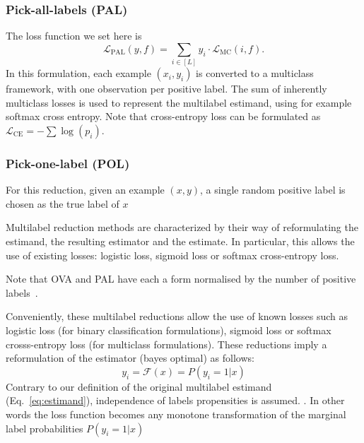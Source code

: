 \subsubsection*{Pick-all-labels (PAL)}
The loss function we set here is
%
\begin{equation}
\mathcal{L}_{\mathrm{PAL}}(y, f) = \sum_{i \in[L]} y_{i} \cdot \mathcal{L}_{\mathrm{MC}}(i, f).
\end{equation}
%
In this formulation, each example $(x_i, y_i)$ is converted to a multiclass framework, with one observation per positive label. The sum of inherently multiclass losses is used to represent the multilabel estimand, using for example softmax cross entropy. Note that cross-entropy loss can be formulated as \(\mathcal{L}_{\text {CE}}=-\sum \log \left(p_{i}\right)\).

\subsubsection*{Pick-one-label (POL)}

For this reduction, given an example $(x,y)$, a single random positive label is chosen as the true label of $x$

\vspace{\baselineskip}

Multilabel reduction methods are characterized by their way of reformulating the estimand, the resulting estimator and the estimate. In particular, this allows the use of existing losses: logistic loss, sigmoid loss or softmax cross-entropy loss.

Note that OVA and PAL have each a form normalised by the number of positive labels~\cite{multilabelReduction}.

Conveniently, these multilabel reductions allow the use of known losses such as logistic loss (for binary classification formulations), sigmoid loss or softmax crosss-entropy loss (for multiclass formulations). These reductions imply a reformulation of the estimator (bayes optimal) as follows:
%
\begin{equation}
  y_i = \mathcal{F}(x) = P(y_i = 1 | x)
\end{equation}
%
Contrary to our definition of the original multilabel estimand (Eq.~\ref{eq:estimand}), independence of labels propensities is assumed. . In other words the loss function becomes any monotone transformation of the marginal label probabilities $ P(y_i = 1 | x)$ ~\cite{OVA2, multilabelMetrics, unifiedView}

